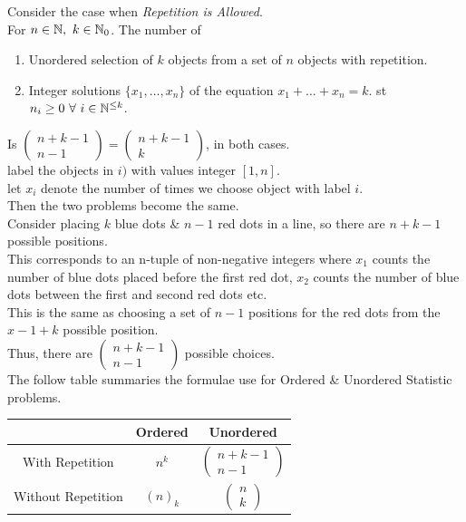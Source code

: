 \documentclass[11pt,a4paper]{article}
\begin{document}
\proposition{}
Consider the case when \textit{Repetition is Allowed}.\\
For $n\in\mathbb{N},\ k\in\mathbb{N}_0$. The number of
\begin{enumerate}[label=\roman*)]
	\item Unordered selection of $k$ objects from a set of $n$ objects with repetition.
	\item Integer solutions $\{x_1,\dots,x_n\}$ of the equation $x_1+\dots+x_n=k$. st $n_i\geq0\ \forall\ i\in\mathbb{N}^{\leq k}$.
\end{enumerate}
Is $\begin{pmatrix}n+k-1\\n-1\end{pmatrix}=\begin{pmatrix}n+k-1\\k\end{pmatrix}$, in both cases.\\

label the objects in $i)$ with values integer $[1,n]$.\\
let $x_i$ denote the number of times we choose object with label $i$.\\
Then the two problems become the same.\\
Consider placing $k$ blue dots \& $n-1$ red dots in a line, so there are $n+k-1$ possible positions.\\
This corresponds to an n-tuple of non-negative integers where $x_1$ counts the number of blue dots placed before the first red dot, $x_2$ counts the number of blue dots between the first and second red dots etc.\\
This is the same as choosing a set of $n-1$ positions for the red dots from the $x-1+k$ possible position.\\
Thus, there are $\begin{pmatrix}n+k-1\\n-1\end{pmatrix}$ possible choices.\\

The follow table summaries the formulae use for Ordered \& Unordered Statistic problems.\\
\begin{tabular}{c|c|c}
&Ordered&Unordered\\
\hline
With Repetition&$n^k$&$\begin{pmatrix}n+k-1\\n-1\end{pmatrix}$\\
Without Repetition&$(n)_k$&$\begin{pmatrix}n\\k\end{pmatrix}$
\end{tabular}
\end{document}
